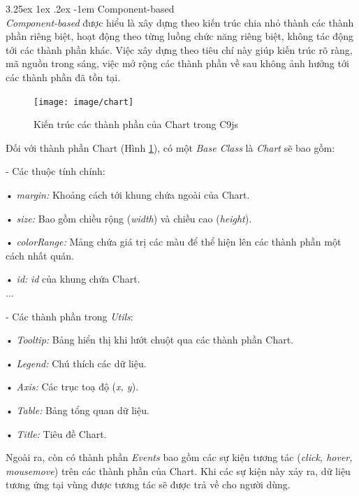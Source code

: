 \documentclass[12pt,a4paper]{article}
\makeatletter
\newcommand{\myparagraph}[1]{\paragraph{#1}\mbox{}\\} %
\renewcommand\paragraph{\@startsection{paragraph}{5}{\z@}%
  {3.25ex \@plus1ex \@minus.2ex}%
  {-1em}%
  {\normalfont\normalsize\bfseries}}
\makeatother
\begin{document}
\myparagraph{Component-based} 
\textit{Component-based}\cite{component_based} được hiểu là xây dựng theo kiến trúc chia nhỏ thành các thành phần riêng biệt, hoạt động theo từng luồng chức năng riêng biệt, không tác động tới các thành phần khác. Việc xây dựng theo tiêu chí này giúp kiến trúc rõ ràng, mã nguồn trong sáng, việc mở rộng các thành phần về sau không ảnh hưởng tới các thành phần đã tồn tại.

\begin{figure}[htp]
	\begin{center}
    \texttt{[image: image/chart]}
    \caption{Kiến trúc các thành phần của Chart trong C9js}
    \label{fig:chart}
	\end{center}
\end{figure}

Đối với thành phần Chart (Hình \ref{fig:chart}), có một \textit{Base Class} là \textit{Chart} sẽ bao gồm:
\begin{list}{}{}
\item[-] Các thuộc tính chính:
\begin{list}{}{}
\item[•] \emph{margin:} Khoảng cách tới khung chứa ngoài của Chart.
\item[•] \emph{size:} Bao gồm chiều rộng (\textit{width}) và chiều cao (\textit{height}).
\item[•] \emph{colorRange:} Mảng chứa giá trị các màu để thể hiện lên các thành phần một cách nhất quán.
\item[•] \emph{id:} \textit{id} của khung chứa Chart.\\
...
\end{list}
\item[-] Các thành phần trong \textit{Utils}:
\begin{list}{}{}
\item[•] \emph{Tooltip:} Bảng hiển thị khi lướt chuột qua các thành phần Chart.
\item[•] \emph{Legend:} Chú thích các dữ liệu.
\item[•] \emph{Axis:} Các trục toạ độ (\textit{x, y}).
\item[•] \emph{Table:} Bảng tổng quan dữ liệu.
\item[•] \emph{Title:} Tiêu đề Chart.
\end{list}
\end{list}

Ngoài ra, còn có thành phần \textit{Events} bao gồm các sự kiện tương tác (\textit{click, hover, mousemove}) trên các thành phần của Chart. Khi các sự kiện này xảy ra, dữ liệu tương ứng tại vùng được tương tác sẽ được trả về cho người dùng.
\end{document}

